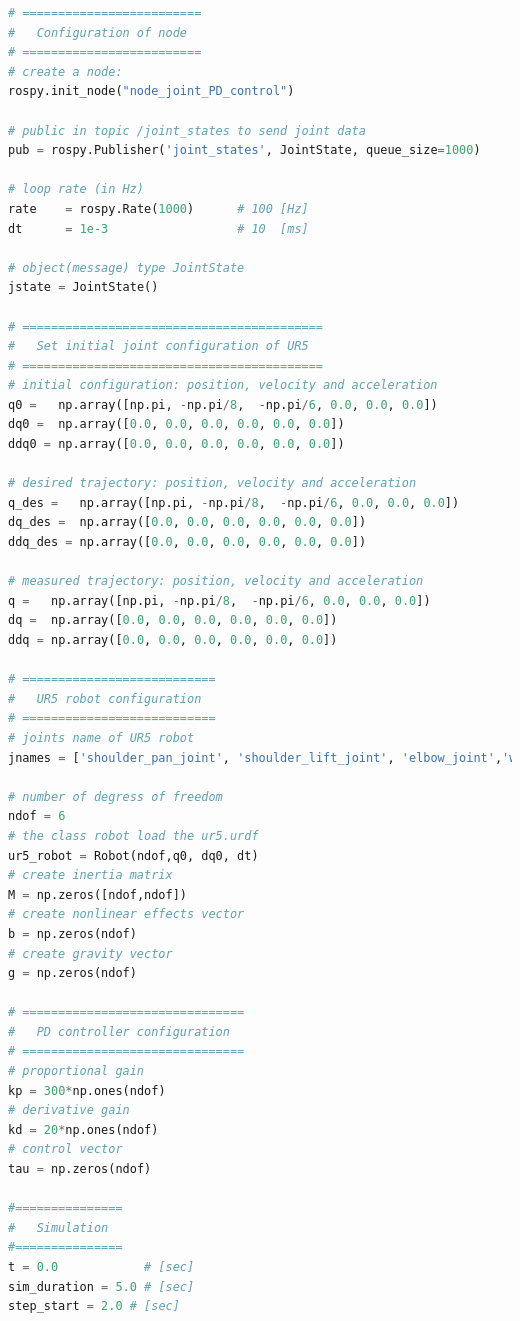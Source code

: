 \begin{lstlisting}[language=Python,caption={Rosnode to move the second and fifth joint of UR5 robot with the requirement motion of activity 1.3.}, label={lst:joint_PD_control}]
# =========================
#   Configuration of node
# =========================
# create a node: 
rospy.init_node("node_joint_PD_control")

# public in topic /joint_states	to send joint data	
pub = rospy.Publisher('joint_states', JointState, queue_size=1000)

# loop rate (in Hz)
rate 	= rospy.Rate(1000)		# 100 [Hz]
dt 		= 1e-3					# 10  [ms]

# object(message) type JointState
jstate = JointState()

# ==========================================
#   Set initial joint configuration of UR5
# ==========================================
# initial configuration: position, velocity and acceleration 
q0 =   np.array([np.pi, -np.pi/8,  -np.pi/6, 0.0, 0.0, 0.0])
dq0 =  np.array([0.0, 0.0, 0.0, 0.0, 0.0, 0.0]) 
ddq0 = np.array([0.0, 0.0, 0.0, 0.0, 0.0, 0.0]) 

# desired trajectory: position, velocity and acceleration
q_des =   np.array([np.pi, -np.pi/8,  -np.pi/6, 0.0, 0.0, 0.0]) 
dq_des =  np.array([0.0, 0.0, 0.0, 0.0, 0.0, 0.0]) 
ddq_des = np.array([0.0, 0.0, 0.0, 0.0, 0.0, 0.0]) 

# measured trajectory: position, velocity and acceleration
q =   np.array([np.pi, -np.pi/8,  -np.pi/6, 0.0, 0.0, 0.0])
dq =  np.array([0.0, 0.0, 0.0, 0.0, 0.0, 0.0]) 
ddq = np.array([0.0, 0.0, 0.0, 0.0, 0.0, 0.0]) 

# ===========================
#   UR5 robot configuration
# ===========================
# joints name of UR5 robot
jnames = ['shoulder_pan_joint', 'shoulder_lift_joint', 'elbow_joint','wrist_1_joint', 'wrist_2_joint', 'wrist_3_joint']

# number of degress of freedom
ndof = 6
# the class robot load the ur5.urdf
ur5_robot = Robot(ndof,q0, dq0, dt)
# create inertia matrix 
M = np.zeros([ndof,ndof])
# create nonlinear effects vector
b = np.zeros(ndof)
# create gravity vector
g = np.zeros(ndof)

# ===============================
#   PD controller configuration
# ===============================
# proportional gain
kp = 300*np.ones(ndof)
# derivative gain
kd = 20*np.ones(ndof)
# control vector
tau = np.zeros(ndof)    

#===============
#   Simulation
#===============
t = 0.0            # [sec] 
sim_duration = 5.0 # [sec]
step_start = 2.0 # [sec]


\end{lstlisting}
